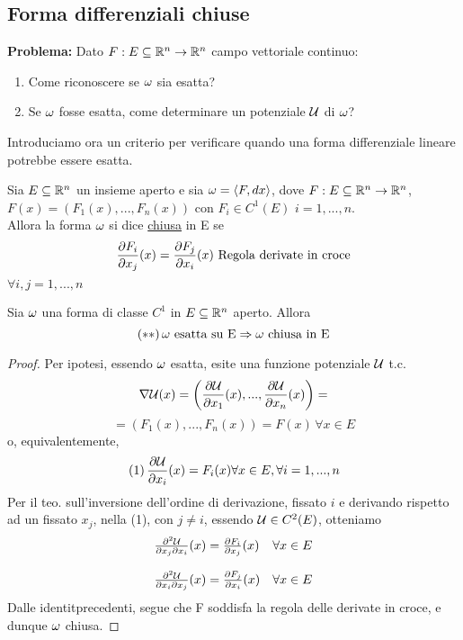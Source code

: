 \subsection{Forma differenziali chiuse}
\textbf{Problema:} Dato $F:E\subseteq\mathbb{R}^n\to\mathbb{R}^n$ campo vettoriale continuo:
\begin{enumerate}
  \item Come riconoscere se $\omega$ sia esatta?
  \item Se $\omega$ fosse esatta, come determinare un potenziale $\mathcal{U}$ di $\omega$?
\end{enumerate}
Introduciamo ora un criterio per verificare quando una forma differenziale lineare potrebbe essere esatta.
\begin{definition}
  Sia $E\subseteq\mathbb{R}^n$ un insieme aperto e sia $\omega = \left\langle F,dx \right\rangle$, dove $F:E\subseteq\mathbb{R}^n \to \mathbb{R}^n$,
  $F(x) = \left(F_1(x),...,F_n(x)\right)$ con $F_i \in C^1(E)$ $i = 1,...,n$. \\
  Allora la forma $\omega$ si dice \underline{chiusa} in E se 
  $$\frac{\partial F_i}{\partial x_j}(x) = \frac{\partial F_j}{\partial x_i}(x) \text{ Regola derivate in croce}$$
  $\forall i,j = 1,...,n$
\end{definition}
\begin{proposition}
  Sia $\omega$ una forma di classe $C^1$ in $E\subseteq\mathbb{R}^n$ aperto. Allora 
  $$(**) \, \omega \text{ esatta su E} \Rightarrow \omega \text{ chiusa in E}$$
  \begin{proof}
    Per ipotesi, essendo $\omega$ esatta, esite una funzione potenziale $\mathcal{U}$ t.c.
    $$\nabla\mathcal{U}(x) = \left(\frac{\partial\mathcal{U}}{\partial x_1}(x),...,\frac{\partial\mathcal{U}}{\partial x_n}(x) \right) = $$
    $$=\left(F_1(x),...,F_n(x)\right) = F(x) \, \forall x \in E$$
    o, equivalentemente, 
    $$(1)\, \frac{\partial\mathcal{U}}{\partial x_i}(x) = F_i(x) \forall x \in E, \forall i = 1,...,n$$
    Per il teo. sull'inversione dell'ordine di derivazione, fissato $i$ e derivando 
    rispetto ad un fissato $x_j$, nella (1), con $j\neq i$, essendo $\mathcal{U} \in C^2(E)$,
    otteniamo 
    $$\begin{array}{ll}
      \frac{\partial^2\mathcal{U}}{\partial x_j \partial x_i} (x) = \frac{\partial F_i}{\partial x_j}(x) & \forall x \in E \\
      \\
      \frac{\partial^2\mathcal{U}}{\partial x_i \partial x_j} (x) = \frac{\partial F_j}{\partial x_i}(x) & \forall x \in E \\
    \end{array}$$
    Dalle identit\aca precedenti, segue che F soddisfa la regola delle derivate in croce, e
    dunque $\omega$ \ace chiusa.
  \end{proof}
\end{proposition}
